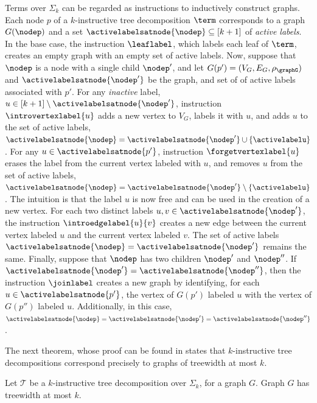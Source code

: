 Terms over $\Sigma_k$ can be regarded as instructions to inductively construct graphs. Each node $p$ of a $k$-instructive tree decomposition $\term$ corresponds to a graph $G(\nodep)$ and a set $\activelabelsatnode{\nodep} \subseteq [k+1]$ of \emph{active labels}. In the base case, the instruction $\leaflabel$, which labels each leaf of $\term$, creates an empty graph with an empty set of active labels. Now, suppose that $\nodep$ is a node with a single child $\nodep'$, and let 
$G(p') = (V_G,E_G,\rho_\graphG)$ and $\activelabelsatnode{\nodep'}$ be the graph, and set of of active labels associated with $p'$. For any \textit{inactive} label, $u \in [k+1]\setminus \activelabelsatnode{\nodep'}$, instruction $\introvertexlabel{u}$ adds a new vertex to $V_G$, labels it with $u$, and adds $u$ to the set of active labels, $\activelabelsatnode{\nodep} = \activelabelsatnode{\nodep'} \cup \{\activelabelu\}$. For any $u \in \activelabelsatnode{p'}$, instruction $\forgetvertexlabel{u}$ erases the label from the current vertex labeled with $u$, and removes $u$ from the set of active labels, $\activelabelsatnode{\nodep} = \activelabelsatnode{\nodep'} \setminus \{\activelabelu\}$ . The intuition is that the label $u$ is now free and can be used in the creation of a new vertex. For each two distinct labels $u,v \in \activelabelsatnode{\nodep'}$, the instruction $\introedgelabel{u}{v}$ creates a new edge between the current vertex labeled $u$ and the current vertex labeled $v$. The set of active labels $\activelabelsatnode{\nodep} = \activelabelsatnode{\nodep'}$ remains the same. 
Finally, suppose that $\nodep$ has two children $\nodep'$ and $\nodep''$. If $\activelabelsatnode{\nodep'} = \activelabelsatnode{\nodep''}$, then the instruction $\joinlabel$ creates a new graph by identifying, for each $u \in \activelabelsatnode{p'}$, the vertex of $G(p')$ labeled $u$ with the vertex of $G(p'')$ labeled $u$. Additionally, in this case, $\activelabelsatnode{\nodep} = \activelabelsatnode{\nodep'} = \activelabelsatnode{\nodep''}$.


The next theorem, whose proof can be found in \cite{From2023} states that $k$-instructive tree decompositions correspond precisely to graphs of treewidth at most $k$. 

\begin{theorem}
    Let $\mathcal{T}$ be a $k$-instructive tree decomposition over $\Sigma_k$, for a graph $G$. Graph $G$ has treewidth at most $k$.
\end{theorem}


